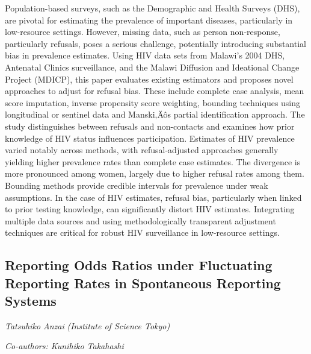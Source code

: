 \documentclass[
]{scrreprt}
\begin{document}
\setlength{\parskip}{0.5em}

Population-based surveys, such as the Demographic and Health Surveys
(DHS), are pivotal for estimating the prevalence of important diseases,
particularly in low-resource settings. However, missing data, such as
person non-response, particularly refusals, poses a serious challenge,
potentially introducing substantial bias in prevalence estimates. Using
HIV data sets from Malawi's 2004 DHS, Antenatal Clinics surveillance,
and the Malawi Diffusion and Ideational Change Project (MDICP), this
paper evaluates existing estimators and proposes novel approaches to
adjust for refusal bias. These include complete case analysis, mean
score imputation, inverse propensity score weighting, bounding
techniques using longitudinal or sentinel data and Manski‚Äôs partial
identification approach. The study distinguishes between refusals and
non-contacts and examines how prior knowledge of HIV status influences
participation. Estimates of HIV prevalence varied notably across
methods, with refusal-adjusted approaches generally yielding higher
prevalence rates than complete case estimates. The divergence is more
pronounced among women, largely due to higher refusal rates among them.
Bounding methods provide credible intervals for prevalence under weak
assumptions. In the case of HIV estimates, refusal bias, particularly
when linked to prior testing knowledge, can significantly distort HIV
estimates. Integrating multiple data sources and using methodologically
transparent adjustment techniques are critical for robust HIV
surveillance in low-resource settings.

\subsection{Reporting Odds Ratios under Fluctuating Reporting Rates in
Spontaneous Reporting
Systems}\label{reporting-odds-ratios-under-fluctuating-reporting-rates-in-spontaneous-reporting-systems}

\emph{Tatsuhiko Anzai} \emph{(Institute of
Science Tokyo)}

\emph{Co-authors: Kunihiko Takahashi}

\setlength{\parskip}{0.5em}
\end{document}
